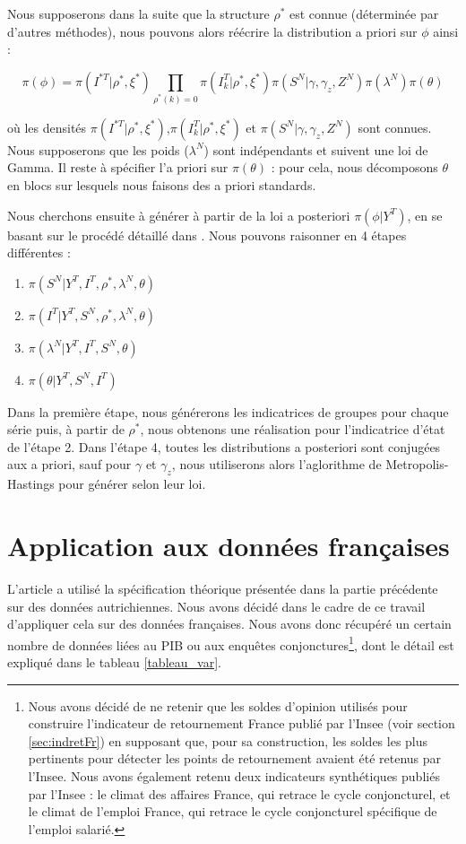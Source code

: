 \documentclass[10pt,french,french]{article}
\let\rmarkdownfootnote\footnote%
\def\footnote{\protect\rmarkdownfootnote}
\begin{document}
Nous supposerons dans la suite que la structure \(\rho^*\) est connue (déterminée par d'autres méthodes), nous pouvons alors réécrire la distribution a priori sur \(\phi\) ainsi :

\[\pi(\phi) = \pi(I^{*T}|\rho^*, \xi^*) \prod \limits_{\rho^*(k)=0} \pi(I^{T}_k|\rho^*,\xi^*)\pi(S^N|\gamma, \gamma_z,Z^N)\pi(\lambda^N)\pi(\theta)\]

où les densités \(\pi(I^{*T}|\rho^*, \xi^*)\),\(\pi(I^{T}_k|\rho^*,\xi^*)\) et \(\pi(S^N|\gamma, \gamma_z,Z^N)\) sont connues.
Nous supposerons que les poids (\(\lambda^N\)) sont indépendants et suivent une loi de Gamma.
Il reste à spécifier l'a priori sur \(\pi(\theta)\) : pour cela, nous décomposons \(\theta\) en blocs sur lesquels nous faisons des a priori standards.

Nous cherchons ensuite à générer à partir de la loi a posteriori \(\pi(\phi|Y^T)\), en se basant sur le procédé détaillé dans \cite{FruhwirthKaufmann}.
Nous pouvons raisonner en 4 étapes différentes :

\begin{enumerate}
\def\labelenumi{\arabic{enumi}.}
\item
  \(\pi(S^N|Y^T, I^T, \rho^*, \lambda^N, \theta)\)
\item
  \(\pi(I^T|Y^T, S^N, \rho^*, \lambda^N, \theta)\)
\item
  \(\pi(\lambda^N|Y^T, I^T, S^N, \theta)\)
\item
  \(\pi(\theta|Y^T,S^N,I^T)\)
\end{enumerate}

Dans la première étape, nous générerons les indicatrices de groupes pour chaque série puis, à partir de \(\rho^*\), nous obtenons une réalisation pour l'indicatrice d'état de l'étape 2.
Dans l'étape 4, toutes les distributions a posteriori sont conjugées aux a priori, sauf pour \(\gamma\) et \(\gamma_z\), nous utiliserons alors l'aglorithme de Metropolis-Hastings pour générer selon leur loi.

\hypertarget{application-aux-donnuxe9es-franuxe7aises}{%
\section{Application aux données françaises}\label{application-aux-donnuxe9es-franuxe7aises}}

L'article \cite{Kaufmann} a utilisé la spécification théorique présentée dans la partie précédente sur des données autrichiennes.
Nous avons décidé dans le cadre de ce travail d'appliquer cela sur des données françaises.
Nous avons donc récupéré un certain nombre de données liées au PIB ou aux enquêtes conjonctures\footnote{Nous avons décidé de ne retenir que les soldes d'opinion utilisés pour construire l'indicateur de retournement France publié par l'Insee (voir section \ref{sec:indretFr}) en supposant que, pour sa construction, les soldes les plus pertinents pour détecter les points de retournement avaient été retenus par l'Insee.
  Nous avons également retenu deux indicateurs synthétiques publiés par l'Insee : le climat des affaires France, qui retrace le cycle conjoncturel, et le climat de l'emploi France, qui retrace le cycle conjoncturel spécifique de l'emploi salarié.}, dont le détail est expliqué dans le tableau \ref{tableau_var}.
\end{document}
